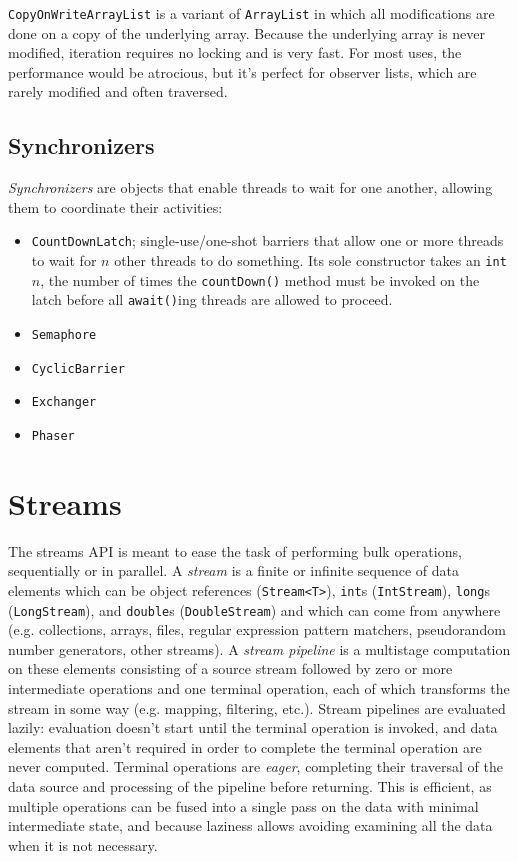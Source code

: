 \documentclass[table, xcdraw]{article}%
\begin{document}
\texttt{CopyOnWriteArrayList} is a variant of \texttt{ArrayList} in which all modifications are done on a copy of the underlying array. Because the underlying array is never modified, iteration requires no locking and is very fast. For most uses, the performance would be atrocious, but it’s perfect for observer lists, which are rarely modified and often traversed.

\subsection{Synchronizers}

\emph{Synchronizers} are objects that enable threads to wait for one another, allowing them to coordinate their activities:

\begin{itemize}
    \item \texttt{CountDownLatch}; single-use/one-shot barriers that allow one or more threads to wait for $n$ other threads to do something. Its sole constructor takes an \texttt{int} $n$, the number of times the \texttt{countDown()} method must be invoked on the latch before all \texttt{await()}ing threads are allowed to proceed.
    \item \texttt{Semaphore}
    \item \texttt{CyclicBarrier}
    \item \texttt{Exchanger}
    \item \texttt{Phaser}
\end{itemize}

\section{Streams}

The streams API is meant to ease the task of performing bulk operations, sequentially or in parallel. A \emph{stream} is a finite or infinite sequence of data elements which can be object references (\texttt{Stream<T>}), \texttt{int}s (\texttt{IntStream}), \texttt{long}s (\texttt{LongStream}), and \texttt{double}s (\texttt{DoubleStream}) and which can come from anywhere (e.g. collections, arrays, files, regular expression pattern matchers, pseudorandom number generators, other streams). A \emph{stream pipeline} is a multistage computation on these elements consisting of a source stream followed by zero or more intermediate operations and one terminal operation, each of which transforms the stream in some way (e.g. mapping, filtering, etc.). Stream pipelines are evaluated lazily: evaluation doesn't start until the terminal operation is invoked, and data elements that aren't required in order to complete the terminal operation are never computed. Terminal operations are \emph{eager}, completing their traversal of the data source and processing of the pipeline before returning. This is efficient, as multiple operations can be fused into a single pass on the data with minimal intermediate state, and because laziness allows avoiding examining all the data when it is not necessary.
\end{document}
